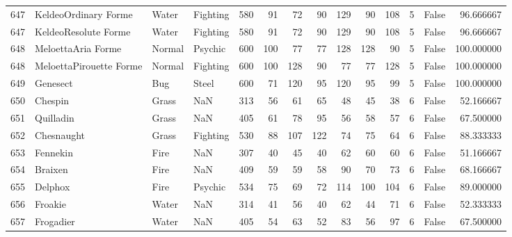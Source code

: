 \begin{tabular}{rlllrrrrrrrrlr}
 647 &       KeldeoOrdinary Forme &     Water &  Fighting &    580 &   91 &      72 &       90 &      129 &       90 &    108 &           5 &      False &   96.666667 \\
 647 &       KeldeoResolute Forme &     Water &  Fighting &    580 &   91 &      72 &       90 &      129 &       90 &    108 &           5 &      False &   96.666667 \\
 648 &         MeloettaAria Forme &    Normal &   Psychic &    600 &  100 &      77 &       77 &      128 &      128 &     90 &           5 &      False &  100.000000 \\
 648 &    MeloettaPirouette Forme &    Normal &  Fighting &    600 &  100 &     128 &       90 &       77 &       77 &    128 &           5 &      False &  100.000000 \\
 649 &                   Genesect &       Bug &     Steel &    600 &   71 &     120 &       95 &      120 &       95 &     99 &           5 &      False &  100.000000 \\
 650 &                    Chespin &     Grass &       NaN &    313 &   56 &      61 &       65 &       48 &       45 &     38 &           6 &      False &   52.166667 \\
 651 &                  Quilladin &     Grass &       NaN &    405 &   61 &      78 &       95 &       56 &       58 &     57 &           6 &      False &   67.500000 \\
 652 &                 Chesnaught &     Grass &  Fighting &    530 &   88 &     107 &      122 &       74 &       75 &     64 &           6 &      False &   88.333333 \\
 653 &                   Fennekin &      Fire &       NaN &    307 &   40 &      45 &       40 &       62 &       60 &     60 &           6 &      False &   51.166667 \\
 654 &                    Braixen &      Fire &       NaN &    409 &   59 &      59 &       58 &       90 &       70 &     73 &           6 &      False &   68.166667 \\
 655 &                    Delphox &      Fire &   Psychic &    534 &   75 &      69 &       72 &      114 &      100 &    104 &           6 &      False &   89.000000 \\
 656 &                    Froakie &     Water &       NaN &    314 &   41 &      56 &       40 &       62 &       44 &     71 &           6 &      False &   52.333333 \\
 657 &                  Frogadier &     Water &       NaN &    405 &   54 &      63 &       52 &       83 &       56 &     97 &           6 &      False &   67.500000 \\

\end{tabular}
